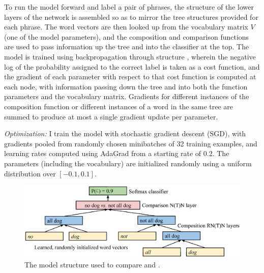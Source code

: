 To run the model forward and label a pair of phrases, the structure of the lower layers of the network is assembled so as to mirror the tree structures provided for each phrase. The word vectors are then looked up from the vocabulary matrix $V$ (one of the model parameters), and the composition and comparison functions are used to pass information up the tree and into the classifier at the top. The model is trained using backpropagation through structure  \cite{goller1996learning}, wherein the negative log of the probability assigned to the correct label is taken as a cost function, and the gradient of each parameter with respect to that cost function is computed at each node, with information passing down the tree and into both the function parameters and the vocabulary matrix. Gradients for different instances of the composition function or different instances of a word in the same tree are summed to produce at most a single gradient update per parameter.

\textit{Optimization:} I train the model with stochastic gradient descent (SGD), with gradients pooled from randomly chosen minibatches of 32 training examples, and learning rates computed using AdaGrad \cite{duchi2011adaptive} from a starting rate of 0.2. The parameters (including the vocabulary) are initialized randomly using a uniform distribution over $[-0.1, 0.1]$. %

\begin{figure}
\begin{center}
\includegraphics[scale=0.36]{model.eps}
\end{center}
\caption{The model structure used to compare  and . \label{sample-figure}} 
\end{figure}

